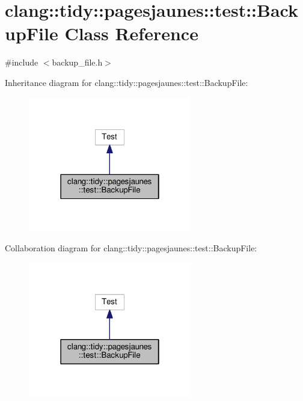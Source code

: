 \hypertarget{classclang_1_1tidy_1_1pagesjaunes_1_1test_1_1_backup_file}{}\section{clang\+:\+:tidy\+:\+:pagesjaunes\+:\+:test\+:\+:Backup\+File Class Reference}
\label{classclang_1_1tidy_1_1pagesjaunes_1_1test_1_1_backup_file}


{\ttfamily \#include $<$backup\+\_\+file.\+h$>$}



Inheritance diagram for clang\+:\+:tidy\+:\+:pagesjaunes\+:\+:test\+:\+:Backup\+File\+:
\nopagebreak
\begin{figure}[H]
\begin{center}
\leavevmode
\includegraphics[width=202pt]{classclang_1_1tidy_1_1pagesjaunes_1_1test_1_1_backup_file__inherit__graph}
\end{center}
\end{figure}


Collaboration diagram for clang\+:\+:tidy\+:\+:pagesjaunes\+:\+:test\+:\+:Backup\+File\+:
\nopagebreak
\begin{figure}[H]
\begin{center}
\leavevmode
\includegraphics[width=202pt]{classclang_1_1tidy_1_1pagesjaunes_1_1test_1_1_backup_file__coll__graph}
\end{center}
\end{figure}
